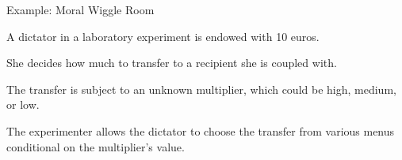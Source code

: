 \documentclass[usenames,dvipsnames,aspectratio=169,11pt, envcountsect]{beamer}
\begin{document}
\begin{frame}{Example: Moral Wiggle Room \citep{danaExploitingMoralWiggle2007}}

	A dictator in a laboratory experiment is endowed with 10 euros.

	\vfill

	She decides how much to transfer to a recipient she is coupled with.

	\vfill

	The transfer is subject to an unknown multiplier, which could be high, medium, or low.

	\vfill

	The experimenter allows the dictator to choose the transfer from various menus conditional on the multiplier's value.

\end{frame}
\end{document}
